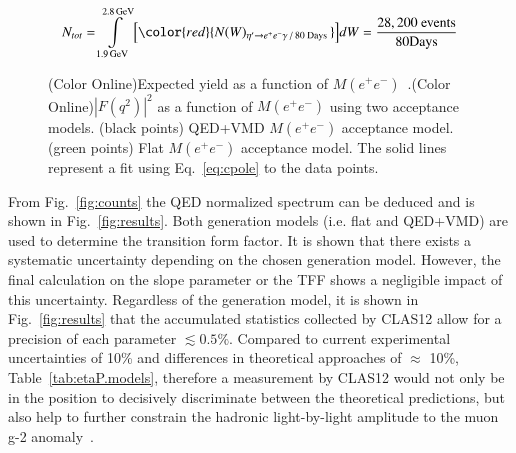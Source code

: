 \documentclass[epj]{webofc}
\def\etaP{\eta^{\prime}}
\def\epem{e^+e^-}
\begin{document}
\begin{equation}
  N_{tot} = \int\limits_{1.9\,\rm{GeV}}^{2.8\,\rm{GeV}} \Big[ {\color{red}{N(W)_{\etaP\rightarrow\epem\gamma\text{ / 80 Days }}}} \Big]dW = \mathrm{\frac{28,200 \ events}{80 Days}}
\label{yield}
\end{equation}		
\begin{figure}[h!]
		\caption[Something]{\label{fig:clas12_tff}(Color Online)Expected yield as a function of $M(\epem)$~.(Color Online)$\left|F(q^2)\right|^2$ as a function of $M(\epem)$ using two acceptance models. (black points) QED+VMD $M(\epem)$ acceptance model. (green points) Flat $M(\epem)$ acceptance model. The solid lines represent a fit using Eq.~\ref{eq:cpole} to the data points.~}
		
	\end{figure}
	\FloatBarrier
From Fig.~\ref{fig:counts} the QED normalized spectrum can be deduced and is shown in Fig.~\ref{fig:results}. Both generation models (i.e. flat and QED+VMD) are used to determine the transition form factor. It is shown that there exists a systematic uncertainty depending on the chosen generation model. However, the final calculation on the slope parameter or the TFF shows a negligible impact of this uncertainty. Regardless of the generation model, it is shown in Fig.~\ref{fig:results} that the accumulated statistics collected by CLAS12 allow for a precision of each parameter $\lesssim 0.5\%$. Compared to current experimental uncertainties of 10\% and differences in theoretical approaches of $\approx$ 10\%, Table~\ref{tab:etaP.models}, therefore a measurement by CLAS12 would not only be in the position to decisively discriminate between the theoretical predictions, but also help to further constrain the hadronic light-by-light amplitude
to the muon g-2 anomaly~\cite{gminus2}.
\end{document}
